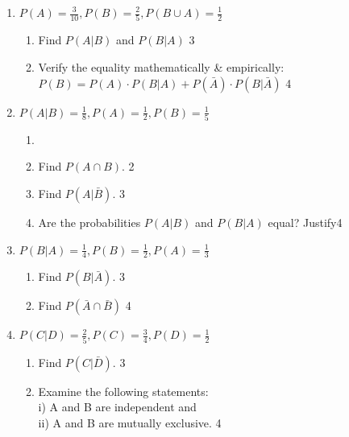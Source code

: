 \documentclass[a4paper,oneside, margin=1.4in]{book}
\begin{document}
\begin{enumerate}
  \begin{enumerate}
    \item
	What is the minimum value of probability? \hfill 1
    \item
	Why can't probability be negative? Explain with an example or theoretically. \hfill 2
    \item  
	Find $P(A \cap B)$ from the stem. \hfill 3
    \item
	Evaluate the professor's assertion. \hfill 4
  \end{enumerate}

 \item
	  \textbf{$P(A) = \frac{3}{10}, P(B) = \frac 25, P(B\cup A) = \frac12$} 
  
  \begin{enumerate}
    \item  
	Find $P(A \vert B)$ and $P(B \vert A)$ \hfill 3
    \item
	Verify the equality mathematically \& empirically: $P(B) = P(A) \cdot P(B \vert A) + P(\bar A) \cdot P(B \vert \bar A)$ \hfill 4
  \end{enumerate}
  
   \item
  \textbf{$P(A\vert B) = \frac 1 8, P(A) = \frac 12, P(B) = \frac 15$}
 
  \begin{enumerate}
    \item
    \item
    	Find $P(A\cap B)$.  \hfill 2
    \item
    	Find $P(A\vert \bar B)$. \hfill 3
     \item
     	Are the probabilities $P(A\vert B)$ and $P(B\vert A)$ equal? Justify\hfill 4
  \end{enumerate}
  
  \item \textbf{\( P(B \vert A) = \frac{1}{4}, P(B) = \frac{1}{2}, P(A) = \frac{1}{3} \)}

\begin{enumerate}
    \item Find \( P(B \vert \bar{A}) \). \hfill 3
    \item Find $P(\bar A \cap \bar B)$ \hfill 4
\end{enumerate}

\item \textbf{\( P(C \vert D) = \frac{2}{5}, P(C) = \frac{3}{4}, P(D) = \frac{1}{2} \)}

\begin{enumerate}
    \item Find \( P(C \vert \bar{D}) \). \hfill 3
    \item Examine the following statements: \\ i) A and B are independent and \\
    ii) A and B are mutually exclusive. \hfill 4
\end{enumerate}


\end{enumerate}
\end{document}
